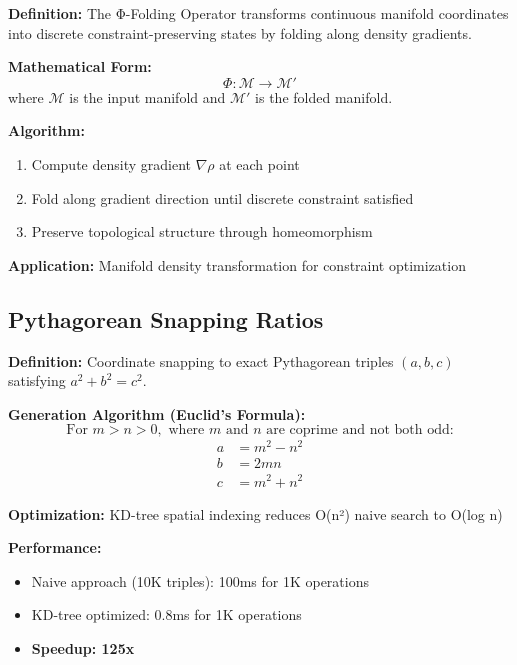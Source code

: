 \documentclass{article}
\begin{document}
\textbf{Definition:} The Φ-Folding Operator transforms continuous manifold coordinates into discrete constraint-preserving states by folding along density gradients.

\textbf{Mathematical Form:}
\begin{equation}
\Phi: \mathcal{M} \rightarrow \mathcal{M}'
\end{equation}
where $\mathcal{M}$ is the input manifold and $\mathcal{M}'$ is the folded manifold.

\textbf{Algorithm:}
\begin{enumerate}
    \item Compute density gradient $\nabla\rho$ at each point
    \item Fold along gradient direction until discrete constraint satisfied
    \item Preserve topological structure through homeomorphism
\end{enumerate}

\textbf{Application:} Manifold density transformation for constraint optimization

\subsection{Pythagorean Snapping Ratios}

\textbf{Definition:} Coordinate snapping to exact Pythagorean triples $(a, b, c)$ satisfying $a^2 + b^2 = c^2$.

\textbf{Generation Algorithm (Euclid's Formula):}
\begin{equation}
\text{For } m > n > 0, \text{ where } m \text{ and } n \text{ are coprime and not both odd:}
\end{equation}
\begin{align}
a &= m^2 - n^2 \\
b &= 2mn \\
c &= m^2 + n^2
\end{align}

\textbf{Optimization:} KD-tree spatial indexing reduces O(n²) naive search to O(log n)

\textbf{Performance:}
\begin{itemize}
    \item Naive approach (10K triples): 100ms for 1K operations
    \item KD-tree optimized: 0.8ms for 1K operations
    \item \textbf{Speedup: 125x}
\end{itemize}
\end{document}
